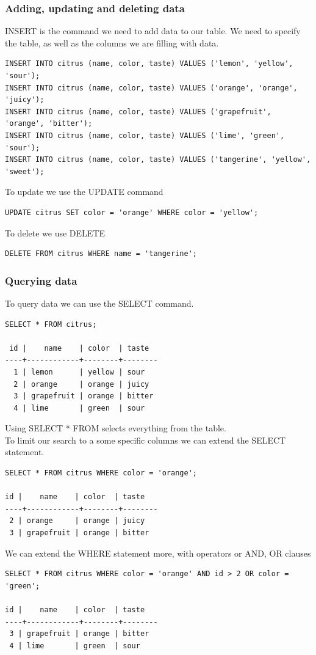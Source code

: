 \documentclass[a4paper]{article}
\begin{document}
\subsubsection{Adding, updating and deleting data}
INSERT is the command we need to add data to our table. We need to specify the table, as well as the columns we are filling with data.
\begin{lstlisting}
INSERT INTO citrus (name, color, taste) VALUES ('lemon', 'yellow', 'sour');
INSERT INTO citrus (name, color, taste) VALUES ('orange', 'orange', 'juicy');
INSERT INTO citrus (name, color, taste) VALUES ('grapefruit', 'orange', 'bitter');
INSERT INTO citrus (name, color, taste) VALUES ('lime', 'green', 'sour');
INSERT INTO citrus (name, color, taste) VALUES ('tangerine', 'yellow', 'sweet');
\end{lstlisting}
To update we use the UPDATE command
\begin{lstlisting}
UPDATE citrus SET color = 'orange' WHERE color = 'yellow';
\end{lstlisting}
To delete we use DELETE
\begin{lstlisting}
DELETE FROM citrus WHERE name = 'tangerine';
\end{lstlisting}

\subsubsection{Querying data}
To query data we can use the SELECT command.
\begin{lstlisting}
SELECT * FROM citrus;

 id |    name    | color  | taste
----+------------+--------+--------
  1 | lemon      | yellow | sour
  2 | orange     | orange | juicy
  3 | grapefruit | orange | bitter
  4 | lime       | green  | sour
\end{lstlisting}
Using SELECT * FROM selects everything from the table.\\

To limit our search to a some specific columns we can extend the SELECT statement.
\begin{lstlisting}
SELECT * FROM citrus WHERE color = 'orange';

id |    name    | color  | taste
----+------------+--------+--------
 2 | orange     | orange | juicy
 3 | grapefruit | orange | bitter
\end{lstlisting}
We can extend the WHERE statement more, with operators or AND, OR clauses
\begin{lstlisting}
SELECT * FROM citrus WHERE color = 'orange' AND id > 2 OR color = 'green';

id |    name    | color  | taste
----+------------+--------+--------
 3 | grapefruit | orange | bitter
 4 | lime       | green  | sour
\end{lstlisting}
\end{document}

